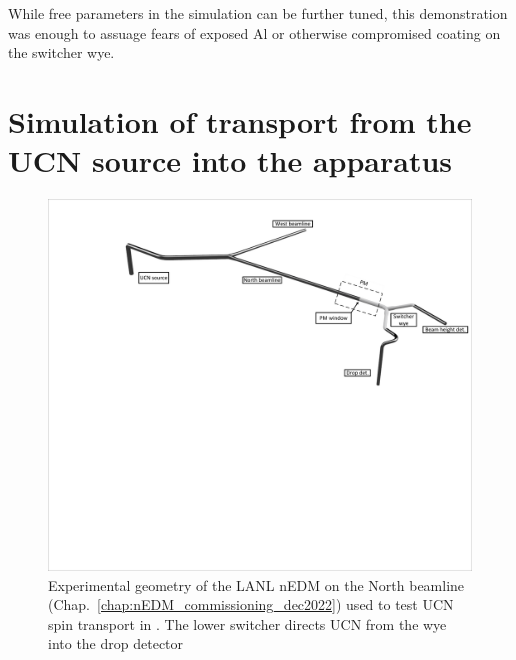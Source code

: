 While free parameters in the simulation can be further tuned, this demonstration was enough to assuage fears of exposed Al or otherwise compromised coating on the switcher wye. 


\section{Simulation of transport from the UCN source into the apparatus}\label{sec:switcher_wye_transport_monte_carlo}


\begin{figure}
    \centering
    \includegraphics[width=\textwidth]{figures/2022_north_beamline_drop_pentrack.pdf}
    \caption
    {Experimental geometry of the LANL nEDM on the North beamline (Chap.~\ref{chap:nEDM_commissioning_dec2022}) used to test UCN spin transport in \pentrack. The lower switcher directs UCN from the wye into the drop detector}
    \label{fig:2022_beamline_pentrack_drop}
    \vspace{\baselineskip}
    \centering

\end{figure}
